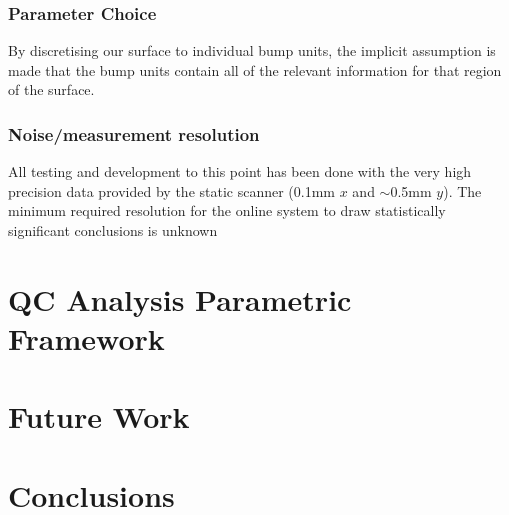 \documentclass[12pt]{report}
\begin{document}
        \subsection{Parameter Choice}
            By discretising our surface to individual bump units, the implicit assumption is made that the bump units contain all of the relevant information for that region of the surface.
        \subsection{Noise/measurement resolution}
            All testing and development to this point has been done with the very high precision data provided by the static scanner (0.1mm $x$ and $\sim$0.5mm $y$). The minimum required resolution for the online system to draw statistically significant conclusions is unknown
            
\chapter{QC Analysis Parametric Framework}
\chapter{Future Work}
\chapter{Conclusions}



\end{document}
